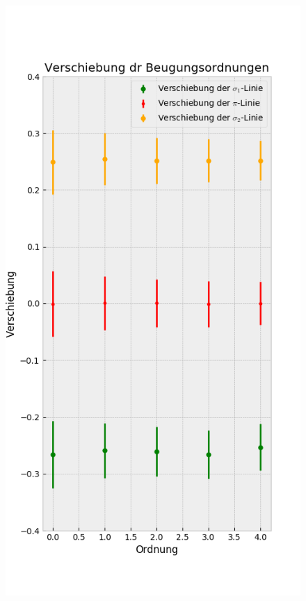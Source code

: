 \begin{landscape}
\begin{figure}
            \includegraphics[width=.45\paperwidth]{Auswertung/scatterorder/diff_sco12A}

\end{figure}
\end{landscape}
